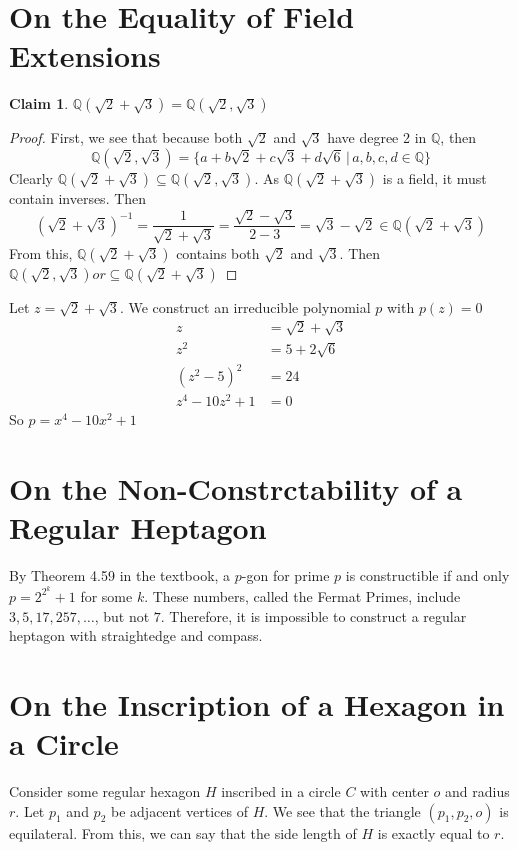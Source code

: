 \documentclass[12pt]{article}
\newtheorem*{claim*}{Claim}
\newcommand*{\Q}{\mathbb{Q}}
\newcommand*{\inv}{^{-1}}
\begin{document}
\section{On the Equality of Field Extensions}
\begin{claim*}
$\Q(\sqrt{2} + \sqrt{3}) = \Q(\sqrt{2}, \sqrt{3})$
\end{claim*}
\begin{proof}
First, we see that because both $\sqrt{2}$ and $\sqrt{3}$ have degree 2 in $\Q$, then
\[\Q(\sqrt{2}, \sqrt{3}) = \{a + b\sqrt{2} + c\sqrt{3} + d\sqrt{6} \, | \, a,b,c,d \in \Q\}\]
Clearly $\Q(\sqrt{2} + \sqrt{3}) \subseteq \Q(\sqrt{2}, \sqrt{3})$. As $\Q(\sqrt{2} + \sqrt{3})$ is a field, it must contain inverses. Then
\[(\sqrt{2} + \sqrt{3})\inv = \frac{1}{\sqrt{2} + \sqrt{3}} = \frac{\sqrt{2} - \sqrt{3}}{2 - 3} = \sqrt{3} - \sqrt{2} \in \Q(\sqrt{2} + \sqrt{3})\]
From this, $\Q(\sqrt{2} + \sqrt{3})$ contains both $\sqrt{2}$ and $\sqrt{3}$. Then $\Q(\sqrt{2}, \sqrt{3}) or \subseteq \Q(\sqrt{2} + \sqrt{3})$
\end{proof}
\noindent Let $z = \sqrt{2} + \sqrt{3}$. We construct an irreducible polynomial $p$ with $p(z) = 0$
\begin{align*}
z &= \sqrt{2} + \sqrt{3}\\
z^2 &= 5 + 2 \sqrt{6}\\
(z^2 - 5)^2 &= 24\\
z^4 - 10z^2 + 1 &= 0
\end{align*}
So $p = x^4 - 10x^2 + 1$

\section{On the Non-Constrctability of a Regular Heptagon}
By Theorem 4.59 in the textbook, a $p$-gon for prime $p$ is constructible if and only $p = 2 ^ {2 ^ k} + 1$ for some $k$. These numbers, called the Fermat Primes, include $3, 5, 17, 257, \ldots$, but not $7$. Therefore, it is impossible to construct a regular heptagon with straightedge and compass.


\section{On the Inscription of a Hexagon in a Circle}
Consider some regular hexagon $H$ inscribed in a circle $C$ with center $o$ and radius $r$. Let $p_1$ and $p_2$ be adjacent vertices of $H$. We see that the triangle $(p_1,p_2,o)$ is equilateral. From this, we can say that the side length of $H$ is exactly equal to $r$.
\end{document}
